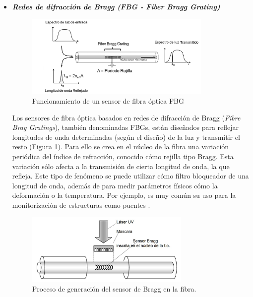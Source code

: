	\begin{itemize}
		\item \textit{\textbf{Redes de difracción de Bragg \textit{(FBG - Fiber Bragg Grating)}}}	
		
		\begin{figure}[H]
			\centering
			\includegraphics[width=0.85\textwidth]{./img/operacionFBG}
			\caption{Funcionamiento de un sensor de fibra óptica FBG \cite{funcionamientoFBG}} 
			\label{fig:funcionamientoFBG}
		\end{figure}		
		
		Los sensores de fibra óptica basados en redes de difracción de Bragg (\textit{Fibre Brag Gratings}), también denominadas FBGs, están diseñados para reflejar longitudes de onda determinadas (según el diseño) de la luz y transmitir el resto (Figura \ref{fig:funcionamientoFBG}). Para ello se crea en el núcleo de la fibra una variación periódica del índice de refracción, conocido cómo rejilla tipo Bragg. Esta variación sólo afecta a la transmisión de cierta longitud de onda, la que refleja. Este tipo de fenómeno se puede utilizar cómo filtro bloqueador de una longitud de onda, además de para medir parámetros físicos cómo la deformación o la temperatura. Por ejemplo, es muy común su uso para la monitorización de estructuras como puentes \cite{FOSensorFrancis}. 
		
		\begin{figure}[H]
			\centering
			\includegraphics[width=0.75\textwidth]{./img/FBGmanufactur}
			\caption{Proceso de generación del sensor de Bragg en la fibra. \cite{tesisUPMmalte}} 
			\label{fig:manufacturaBragg}
		\end{figure}
		

\end{itemize}
